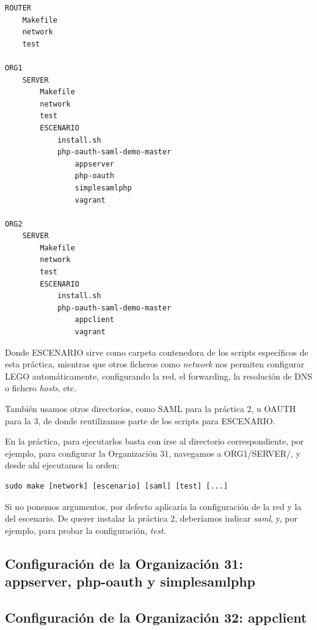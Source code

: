 \documentclass[]{article}
\begin{document}
\hfil

\begin{BVerbatim}
ROUTER
	Makefile
	network
	test

ORG1
	SERVER
		Makefile
		network
		test
		ESCENARIO
			install.sh
			php-oauth-saml-demo-master
				appserver
				php-oauth
				simplesamlphp
				vagrant

ORG2
	SERVER
		Makefile
		network
		test
		ESCENARIO
			install.sh
			php-oauth-saml-demo-master
				appclient
				vagrant
\end{BVerbatim}

\hfill


Donde ESCENARIO sirve como carpeta contenedora de los scripts específicos de esta práctica, mientras que otros ficheros como \textit{network} nos
permiten configurar LEGO automáticamente, configurando la red, el forwarding, la resolución de DNS o fichero \textit{hosts}, etc.

También usamos otros directorios, como SAML para la práctica 2, u OAUTH para la 3, de donde reutilizamos parte de los scripts para ESCENARIO.


\hfill

En la práctica, para ejecutarlos basta con irse al directorio correspondiente, por ejemplo, para configurar la Organización 31, navegamos a ORG1/SERVER/, y desde ahí
ejecutamos la orden:

\begin{verbatim}
sudo make [network] [escenario] [saml] [test] [...]
\end{verbatim}

Si no ponemos argumentos, por defecto aplicaría la configuración de la red y la del escenario. De querer instalar la práctica 2, deberíamos indicar \textit{saml}, y, por ejemplo, para
probar la configuración, \textit{test}.


\subsection{Configuración de la Organización 31: appserver, php-oauth y simplesamlphp}

\subsection{Configuración de la Organización 32: appclient}
\end{document}
